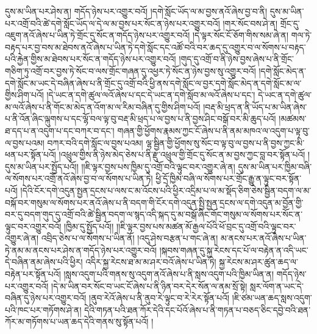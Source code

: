 དུས་མ་ཡིན་པར་ཤེས་ན། གདོད་ཉེས་པར་འགྱུར་བའོ། །དགེ་སློང་ཡོད་ལ་མ་བྱས་ནའོ་ཞེས་བྱ་བ་ནི། དུས་མ་ཡིན་པར་འགྲོ་བའི་ཚེ་དགེ་སློང་ཡོད་ལ་དེ་ལ་མ་བྱས་པར་སོང་ན་ཉེས་པར་འགྱུར་བའོ། །གར་སོང་བས་ཤེ་ན། གྲོང་དུ་འཇུག་ནའོ་ཞེས་པ་ཡིན་ཏེ་གྲོང་དུ་སོང་ན་གདོད་ཉེས་པར་འགྱུར་བའོ། །དེ་ལྟར་སོང་ངོ་ཅོག་གིས་སམ་ཞེ་ན། གལ་ཏེ་བརྟད་པར་བྱ་བས་མ་ཐེབས་ནའོ་ཞེས་པ་ཡིན་ཏེ་དགེ་སློང་དང་འཚོ་བའི་བར་ཆད་དུ་འགྱུར་བ་ལ་སོགས་པ་བརྟད་པའི་རྐྱེན་གྱིས་མ་ཐེབས་པར་སོང་ན་གདོད་ཉེས་པར་འགྱུར་བའོ། །གུད་དུ་འགྲོ་བ་ནི་ཉེས་བྱས་ཞེས་པ་ནི་གྲོང་གཅིག་ཏུ་འགྲོ་བར་བྱས་ཏེ་སོང་བ་ལས་གྲོང་གཞན་དུ་འཕྱར་ཏེ་སོང་ན་ཉེས་བྱས་སུ་འགྱུར་བའོ། །དགེ་སློང་མེད་ན་དགེ་སློང་མ་ཡང་དེ་བཞིན་ཞེས་པ་ནི་གྲོང་དུ་འགྲོ་བའི་ཕྱི་ནས་དགེ་སློང་ལ་བྱར་དགེ་སློང་མེད་ན་དགེ་སློང་མ་ལ་གྱིས་ཤིག་པའོ། །དེ་ཡང་ན་དགེ་ཚུལ་ལའོ་ཞེས་པ་དང་དེ་ཡང་ན་དགེ་སློབ་མ་ལའོ་ཞེས་པ་དང་། དེ་ཡང་ན་དགེ་ཚུལ་མ་ལའོ་ཞེས་པ་ནི་གོང་མ་མེད་ན་འོག་མ་ལ་རིམ་བཞིན་དུ་གྱིས་ཤིག་པའོ། །བརྡ་མི་ཕྲད་ན་ནི་ཡོད་པ་མ་ཡིན་ཞེས་པ་ནི་འོན་ཞིང་ལྐུགས་པ་དང་ལྷོ་བལ་ལྟ་བུ་བརྡ་མི་ཕྲད་པ་ལ་བྱས་པ་ནི་བྱས་ཤིང་བསྒོ་བར་མི་ཆུད་པའོ། །མཚམས་ཐ་དད་པ་ན་འདུག་པ་དང་བཀར་བ་དང་། གཞན་གྱི་ཕྱོགས་རྣམས་ཀྱང་ངོ་ཞེས་པ་ནི་ནམ་མཁའ་ལ་འདུག་པ་ལྟ་བུ་ལ་བྱས་པའམ། བཀར་བའི་དགེ་སློང་ལ་བྱས་པའམ། ལྷ་སྦྱིན་གྱི་ཕྱོགས་སུ་སོང་བ་ལྟ་བུ་ལ་བྱས་པ་ནི་བྱས་ཀྱང་མི་ཕན་པར་སྟོན་པའོ། །འཕྲུལ་གྱིས་ནི་ཉེས་མེད་ཅེས་པ་ནི་རྫུ་འཕྲུལ་གྱི་གྲོང་དུ་སོང་ན་མ་བྱས་ཀྱང་བླ་བར་སྟོན་པའོ། །དུས་མ་ཡིན་པར་སྤྱོད་པའོ།། །།ཇི་ལྟར་བྱས་པས་ཁྱིམ་དུ་འགྲོ་བའི་ལྟུང་བར་འགྱུར་ཞེ་ན། དུས་མ་ཡིན་པར་ཁྱིམ་བཞི་ལ་སོགས་པར་འགྲོ་ནའོ་ཞེས་བྱ་བ་ལ་སོགས་པ་ཡིན་ཏེ། ཕྱི་དྲོ་ཁྱིམ་བཞི་ལ་སོགས་པར་གྲོང་རྒྱུ་ན་ལྟུང་བར་སྟོན་པའོ། །དེའི་ངོར་དགེ་འདུན་སྤྱན་དྲངས་པ་ལས་ང་མ་འོངས་པའི་ཕྱིར་འདྲིམ་པ་ལ་མ་སྡོད་ཅིག་ཅེས་སྦྱིན་བདག་ལ་མ་བསྐོ་བར་གསུམ་ལ་སོགས་པར་ནའོ་ཞེས་པ་ནི་བདག་གི་ངོར་དགེ་འདུན་སྤྱི་སྤྱན་དྲངས་ལ་དགེ་འདུན་མ་བྱོན་གྱི་བར་དུ་བདག་གུད་དུ་འགྲོ་བའི་ཚེ་སྦྱིན་བདག་ལ་སྙད་འདི་སྐད་དུ་མ་བསྒོ་ཞིང་གོང་གསུམ་ལ་སོགས་པར་སོང་ན་ལྟུང་བར་འགྱུར་བའོ། །ཁྱིམ་དུ་སྤྱོད་པའོ།། །།ཇི་ལྟར་བྱས་པས་མཚན་མོ་རྒྱལ་པོའི་ཕོ་བྲང་དུ་འགྲོ་བའི་ལྟུང་བར་འགྱུར་ཞེ་ན། འབྲིད་ཅེས་པ་ལ་སོགས་པ་ཡིན་ནོ། །འདུ་ཤེས་བརྩན་པ་གང་ཞེ་ན། མ་ནངས་པར་ནའོ་ཞེས་པ་ཡིན་ཏེ་ནམ་མ་ནངས་པར་ཤེས་ན་གདོད་ཉེས་པར་འགྱུར་བའོ། །སྐབས་གཞན་དུ་སྐྱ་རེངས་དང་པོ་ལ་བརྟེན་ན་འདི་ཡང་དེ་བཞིན་ནམ་ཞེས་པའི་ཕྱིར། འདིར་སྐྱ་རེངས་ཐ་མ་མ་ཤར་བའོ་ཞེས་པ་ཡིན་ཏེ། སྐྱ་རེངས་མ་ཤར་ཚུན་ཆད་ལ་བརྟེན་པར་སྟོན་པའོ། །སླས་འདུག་པའི་གནས་སུ་འདུག་ནའོ་ཞེས་པ་ནི་སླས་འདུག་པའི་ཁྱིམ་ཡིན་ན། གདོད་ཉེས་པར་འགྱུར་བའོ། །དེ་མ་ཡིན་བར་སོང་བ་ཡང་ངོ་ཞེས་པ་ནི་ཉིན་བར་དེར་སོན་ལ་ནམ་སྲོ་སྟེ། སླར་ལོག་ན་ཡང་དེ་བཞིན་དུ་ཉེས་པར་འགྱུར་བའོ། །ནུབ་རེའོ་ཞེས་པ་ནི་ནུབ་རེ་ལྟུང་བ་རེ་རེར་སྟོན་པའོ། །ཇི་ཙམ་ཡན་ཆད་སླས་འདུག་པའི་ཁང་པར་གཏོགས་ཤེ་ན། དེའི་གཏན་པའི་ཐན་ཀོར་དེའི་དང་པོའོ་ཞེས་པ་ནི་གཏན་པ་བཅད་ཅིང་དབྱེ་བའི་ཐན་ཀོར་མ་གཏོགས་པ་ཡན་ཆད་དེའི་གནས་སུ་སྟོན་པའོ། །
